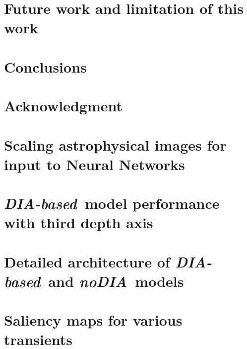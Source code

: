 \documentclass[linenumbers, twocolumn]{aastex631}
\newcommand{\tatiana}[1]{{\color{orange} #1}}
\newcommand{\nodia}{{\it noDIA}}
\newcommand{\diabased}{{\it DIA-based}}
\begin{document}
\section{Future work and limitation of this work}\label{sec:futurework}

\section{Conclusions}\label{sec:conclusion}


\clearpage
\section{Acknowledgment}\label{sec:thanks}


{}

% 
%  
\appendix 
\onecolumngrid 
\section{Scaling astrophysical images for input to Neural Networks}
\label{sec:appendixa}


\tatiana{\section{\diabased\ model performance with third depth axis}
\label{sec:appendix3channel}
}


\section{Detailed architecture of \diabased\ and \nodia\ models}
\label{sec:appendixb}


\clearpage

\section{Saliency maps for various transients}

\label{sec:appendixc}

%
\end{document}
